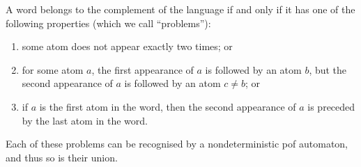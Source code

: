 {
    A word belongs to the complement of the language if and only if it has one of the following properties (which we call ``problems''):
    \begin{enumerate}
        \item some atom does not appear exactly two times; or 
        \item for some atom $a$, the first appearance of $a$ is followed by an atom $b$, but the second appearance of $a$ is followed by an atom $c \neq b$; or
        \item if $a$ is the first atom in the word, then the second appearance of $a$ is preceded by the last atom in the word.
    \end{enumerate}
    Each of these problems can be recognised by a nondeterministic pof automaton, and thus so is their union.
}



